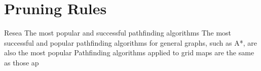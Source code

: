 \section{Pruning Rules}
Resea
The most popular and successful pathfinding algorithms
The most successful and popular pathfinding algorithms for general graphs, such 
as A*, are also the most popular 
Pathfinding algorithms applied to grid maps are the same as those ap
